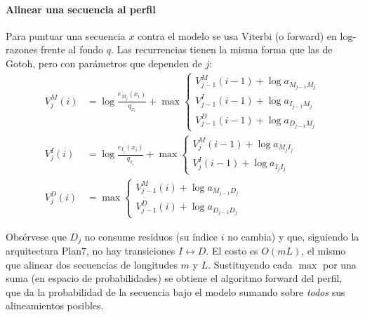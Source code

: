 \paragraph{Alinear una secuencia al perfil} Para puntuar una secuencia $x$ contra el modelo se usa Viterbi (o forward) en log-razones frente al fondo $q$. Las recurrencias tienen la misma forma que las de Gotoh, pero con parámetros que dependen de $j$:
\begin{align}
V^{M}_j(i) &= \log\frac{e_{M_j}(x_i)}{q_{x_i}} + \max\begin{cases}
V^{M}_{j-1}(i-1) + \log a_{M_{j-1}M_j}\\
V^{I}_{j-1}(i-1) + \log a_{I_{j-1}M_j}\\
V^{D}_{j-1}(i-1) + \log a_{D_{j-1}M_j}
\end{cases}\label{eq:04-vm}\\[2pt]
V^{I}_j(i) &= \log\frac{e_{I_j}(x_i)}{q_{x_i}} + \max\begin{cases}
V^{M}_{j}(i-1) + \log a_{M_{j}I_j}\\
V^{I}_{j}(i-1) + \log a_{I_{j}I_j}
\end{cases}\label{eq:04-vi}\\[2pt]
V^{D}_j(i) &= \max\begin{cases}
V^{M}_{j-1}(i) + \log a_{M_{j-1}D_j}\\
V^{D}_{j-1}(i) + \log a_{D_{j-1}D_j}
\end{cases}\label{eq:04-vd}
\end{align}

\begin{simbolos}
\end{simbolos}

\noindent Obsérvese que $D_j$ no consume residuos (su índice $i$ no cambia) y que, siguiendo la arquitectura Plan7, no hay transiciones $I\leftrightarrow D$. El costo es $O(mL)$, el mismo que alinear dos secuencias de longitudes $m$ y $L$. Sustituyendo cada $\max$ por una suma (en espacio de probabilidades) se obtiene el algoritmo forward del perfil, que da la probabilidad de la secuencia bajo el modelo sumando sobre \emph{todos} sus alineamientos posibles.

